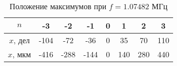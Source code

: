 \begin{table}[h!]
    \centering
    \begin{tabular}{|c|c|c|c|c|c|c|c|}
    \hline
    $n$      & -3   & -2   & -1   & 0 & 1   & 2   & 3   \\ \hline
    $x$, дел & -104 & -72  & -36  & 0 & 35  & 70  & 110 \\ \hline
    $x$, мкм & -416 & -288 & -144 & 0 & 140 & 280 & 440 \\ \hline
    \end{tabular}
    \caption{Положение максимумов при $f = 1.07482$ МГц}
    \label{tab:frequency2}
\end{table}